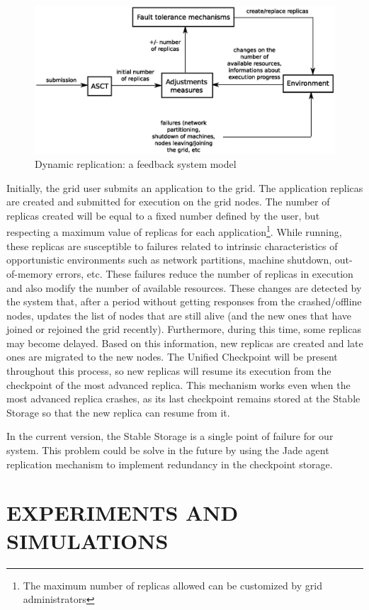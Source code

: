 \documentclass{cpeauth}
\begin{document}
\begin{figure}[th]
\centering \includegraphics[width=.7\columnwidth]{images/feedback.eps}
\caption{Dynamic replication: a feedback system model}
\label{fig:feedback}
\end{figure}
%
Initially, the grid user submits an application to the grid. The application
replicas are created and submitted for execution on the grid nodes. The number of
replicas created will be equal to a fixed number defined by the user, but
respecting a maximum value of replicas for each application\footnote{The
maximum number of replicas allowed can be customized by grid
administrators}. While running, these replicas are susceptible to failures
related to intrinsic characteristics of opportunistic environments such as
network partitions, machine shutdown, out-of-memory errors, etc. These
failures reduce the number of replicas in execution and also modify the number
of available resources. These changes are detected by the system that, after a
period without getting responses from the crashed/offline nodes, updates the
list of nodes that are still alive (and the new ones that have joined or
rejoined the grid recently). Furthermore, during this time, some
replicas may become delayed. Based on this information, new replicas are
created and late ones are migrated to the new nodes. 
The Unified Checkpoint will be present throughout this process, so new replicas will resume its execution
from the checkpoint of the most advanced replica. This mechanism works even
when the most advanced replica crashes, as its last checkpoint remains stored
at the Stable Storage so that the new replica can resume from it.

In the current version, the Stable Storage is a single point of failure for our
system. This problem could be solve in the future by using the Jade agent
replication mechanism to implement redundancy in the checkpoint storage.

\section{EXPERIMENTS AND SIMULATIONS}\label{sec:eval}
\end{document}
